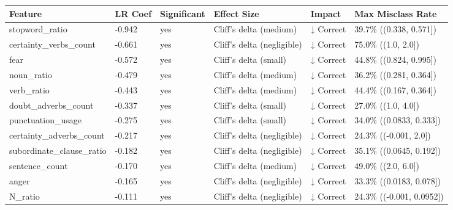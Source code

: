 \begin{tabular}{llllll}
\toprule
Feature & LR Coef & Significant & Effect Size & Impact & Max Misclass Rate \\
\midrule
stopword\_ratio & -0.942 & yes & Cliff's delta (medium) & ↓ Correct & 39.7\% ((0.338, 0.571]) \\
certainty\_verbs\_count & -0.661 & yes & Cliff's delta (negligible) & ↓ Correct & 75.0\% ((1.0, 2.0]) \\
fear & -0.572 & yes & Cliff's delta (small) & ↓ Correct & 44.8\% ((0.824, 0.995]) \\
noun\_ratio & -0.479 & yes & Cliff's delta (medium) & ↓ Correct & 36.2\% ((0.281, 0.364]) \\
verb\_ratio & -0.443 & yes & Cliff's delta (medium) & ↓ Correct & 44.4\% ((0.167, 0.364]) \\
doubt\_adverbs\_count & -0.337 & yes & Cliff's delta (small) & ↓ Correct & 27.0\% ((1.0, 4.0]) \\
punctuation\_usage & -0.275 & yes & Cliff's delta (small) & ↓ Correct & 34.0\% ((0.0833, 0.333]) \\
certainty\_adverbs\_count & -0.217 & yes & Cliff's delta (negligible) & ↓ Correct & 24.3\% ((-0.001, 2.0]) \\
subordinate\_clause\_ratio & -0.182 & yes & Cliff's delta (negligible) & ↓ Correct & 35.1\% ((0.0645, 0.192]) \\
sentence\_count & -0.170 & yes & Cliff's delta (medium) & ↓ Correct & 49.0\% ((2.0, 6.0]) \\
anger & -0.165 & yes & Cliff's delta (negligible) & ↓ Correct & 33.3\% ((0.0183, 0.078]) \\
N\_ratio & -0.111 & yes & Cliff's delta (negligible) & ↓ Correct & 24.3\% ((-0.001, 0.0952]) \\
\bottomrule
\end{tabular}
